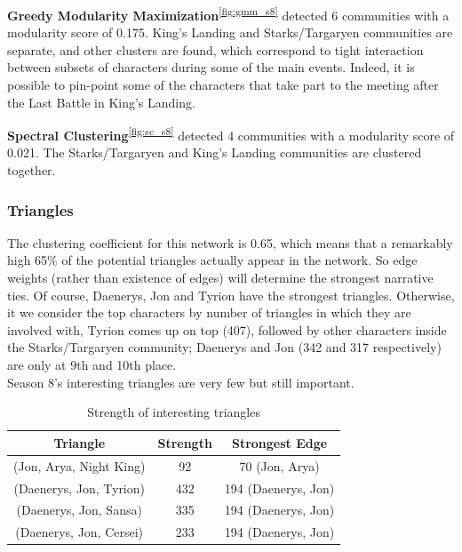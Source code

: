 \documentclass[10pt,twocolumn,letterpaper]{article}
\begin{document}
\textbf{Greedy Modularity Maximization}\textsuperscript{\ref{fig:gmm_s8}} detected 6 communities with a modularity score of 0.175. King's Landing and Starks/Targaryen communities are separate, and other clusters are found, which correspond to tight interaction between subsets of characters during some of the main events. Indeed, it is possible to pin-point some of the characters that take part to the meeting after the Last Battle in King's Landing.

\textbf{Spectral Clustering}\textsuperscript{\ref{fig:sc_s8}} detected 4 communities with a modularity score of 0.021. The Starks/Targaryen and King's Landing communities are clustered together. 

\subsubsection{Triangles}

The clustering coefficient for this network is 0.65, which means that a remarkably high 65\% of the potential triangles actually appear in the network. So edge weights (rather than existence of edges) will determine the strongest narrative ties. Of course, Daenerys, Jon and Tyrion have the strongest triangles.
Otherwise, it we consider the top characters by number of triangles in which they are involved with, Tyrion comes up on top (407), followed by other characters inside the Starks/Targaryen community; Daenerys and Jon (342 and 317 respectively) are only at 9th and 10th place. \\

Season 8's interesting triangles are very few but still important.

\begin{table}[h!]
    \centering
    \small
    \begin{tabular}{c|c|c}
        Triangle & Strength & Strongest Edge  \\
        \hline
        (Jon, Arya, Night King) & 92 & 70 (Jon, Arya) \\
        (Daenerys, Jon, Tyrion) & 432 & 194 (Daenerys, Jon) \\
        (Daenerys, Jon, Sansa) & 335 & 194 (Daenerys, Jon) \\
        (Daenerys, Jon, Cersei) & 233 & 194 (Daenerys, Jon) \\
        \hline 
    \end{tabular} \\
    \vspace{0.2cm}
    \caption{Strength of interesting triangles}
    \label{tab:my_label}
\end{table}
\end{document}
